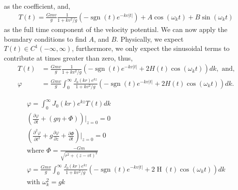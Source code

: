 \documentclass[10pt]{article}
\DeclareMathOperator{\sgn}{sgn}
\DeclareMathOperator{\Heavi}{H}
\begin{document}
as the coefficient, and,
\begin{align*}
T(t) = \frac{Gmv}{g} \frac{1}{1+kv^2/g} \left( -\sgn(t) e^{-kv|t|} \right) + A \cos(\omega_k t) + B \sin(\omega_k t)
\end{align*}
as the full time component of the velocity potential. We can now apply the boundary conditions to find $A$, and $B$. Physically, we expect $T(t) \in C^1(-\infty,\infty)$, furthermore, we only expect the sinusoidal terms to contribute at times greater than zero, thus,
\begin{align*}
T(t) &= \frac{Gmv}{g}\frac{1}{1+kv^2/g} \left(-\sgn(t)e^{-kv|t|} + 2H(t)\cos(\omega_k t) \right)dk, \text{ and,} \\
\varphi &= \frac{Gmv}{g} \int_0^\infty \frac{J_0(kr)e^{kz}}{1+kv^2/g} \left(-\sgn(t)e^{-kv|t|} + 2H(t)\cos(\omega_k t) \right)dk.
\end{align*}

\begin{align*}
\varphi = \int_0^\infty J_0(kr) e^{kz} T(t) dk \\
\left( \frac{\partial \varphi}{\partial t} + (g \eta + \Phi) \right) \bigg|_{z=0} = 0 \\
\left( \frac{\partial^2 \varphi}{\partial t^2} + g \frac{\partial \varphi}{\partial z} + \frac{\partial \Phi}{\partial t} \right) \bigg|_{z=0} = 0\\
\text{where }\Phi = \frac{-Gm}{\sqrt{r^2+(z-vt)^2}} \\
\varphi = \frac{Gmv}{g} \int_0^\infty \frac{J_0(kr)e^{kz}}{1+kv^2/g} \left(-\sgn(t)e^{-kv|t|} + 2 \Heavi (t)\cos(\omega_k t) \right)dk \\
\text{with } \omega_k^2=gk
\end{align*}
\end{document}
